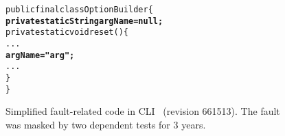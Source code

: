 
\begin{figure}[t]
\begin{CodeOut}
\begin{alltt} 
public final class OptionBuilder \{
  \textbf{private static String argName = null;}
  private static void reset() \{
    ...
    \textbf{argName = "arg";}
    ...
  \}
\}
\end{alltt}
\end{CodeOut}
\vspace*{-15pt}
\caption{Simplified fault-related code in CLI~\cite{cli} (revision 661513).
The fault was masked by two dependent tests for 3 years.
}
\label{fig:option_builder}
\end{figure}
